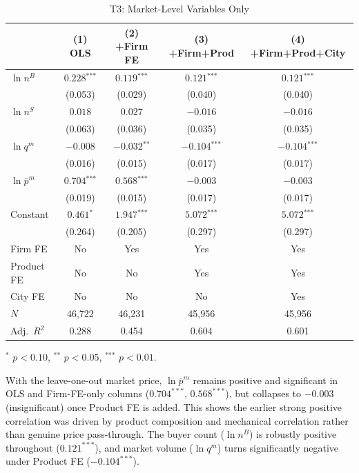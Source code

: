 \documentclass[12pt]{article}
\newcommand{\sym}[1]{\ensuremath{^{\text{#1}}}}
\newcommand{\se}[1]{{\small(#1)}}
\begin{document}
\begin{table}[H]
  \centering
  \caption{T3: Market-Level Variables Only}
  \label{tab:t3}
  \begin{threeparttable}
    \begin{tabular}{lcccc}
      \toprule
      & (1) OLS & (2) +Firm FE & (3) +Firm+Prod & (4) +Firm+Prod+City \\
      \midrule
      \(\ln n^{B}\) & \(0.228\sym{***}\) & \(0.119\sym{***}\) & \(0.121\sym{***}\) & \(0.121\sym{***}\) \\
                    & \se{0.053} & \se{0.029} & \se{0.040} & \se{0.040} \\[4pt]
      \(\ln n^{S}\) & \(0.018\) & \(0.027\) & \(-0.016\) & \(-0.016\) \\
                    & \se{0.063} & \se{0.036} & \se{0.035} & \se{0.035} \\[4pt]
      \(\ln q^{m}\) & \(-0.008\) & \(-0.032\sym{**}\) & \(-0.104\sym{***}\) & \(-0.104\sym{***}\) \\
                    & \se{0.016} & \se{0.015} & \se{0.017} & \se{0.017} \\[4pt]
      \(\ln \bar{p}^{m}\) & \(0.704\sym{***}\) & \(0.568\sym{***}\) & \(-0.003\) & \(-0.003\) \\
                          & \se{0.019} & \se{0.015} & \se{0.017} & \se{0.017} \\[4pt]
      Constant & \(0.461\sym{*}\) & \(1.947\sym{***}\) & \(5.072\sym{***}\) & \(5.072\sym{***}\) \\
               & \se{0.264} & \se{0.205} & \se{0.297} & \se{0.297} \\
      \midrule
      Firm FE    & No  & Yes & Yes & Yes \\
      Product FE & No  & No  & Yes & Yes \\
      City FE    & No  & No  & No  & Yes \\
      \(N\)      & 46,722 & 46,231 & 45,956 & 45,956 \\
      Adj.\ \(R^2\) & 0.288 & 0.454 & 0.604 & 0.601 \\
      \bottomrule
    \end{tabular}
    \begin{tablenotes}[flushleft]
      \footnotesize
      \item \sym{*} \(p<0.10\), \sym{**} \(p<0.05\), \sym{***} \(p<0.01\).
      \item With the leave-one-out market price, \(\ln \bar{p}^{m}\) remains
        positive and significant in OLS and Firm-FE-only columns
        (\(0.704^{***}\), \(0.568^{***}\)), but collapses to \(-0.003\)
        (insignificant) once Product FE is added. This shows the earlier strong
        positive correlation was driven by product composition and mechanical
        correlation rather than genuine price pass-through. The buyer count
        (\(\ln n^{B}\)) is robustly positive throughout (\(0.121^{***}\)), and
        market volume (\(\ln q^{m}\)) turns significantly negative under
        Product FE (\(-0.104^{***}\)).
    \end{tablenotes}
  \end{threeparttable}
\end{table}
\end{document}
